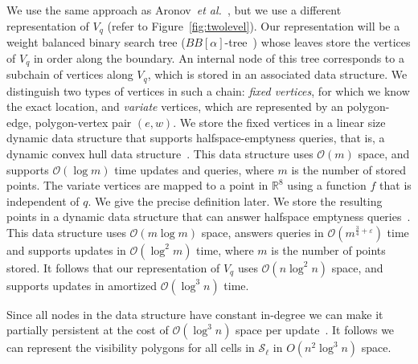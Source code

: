 \documentclass[UKenglish]{lipics-v2019}
\newcommand{\etal}{\textit{et al.}\xspace}
\newcommand{\mkmcal}[1]{\ensuremath{\mathcal{#1}}\xspace}
\renewcommand{\O}{\mkmcal{O}}
\renewcommand{\S}{\mkmcal{S}}
\newcommand{\eps}{\ensuremath{\varepsilon}\xspace}
\newcommand{\mkmbb}[1]{\ensuremath{\mathbb{#1}}\xspace}
\newcommand{\R}{\mkmbb{R}}
\begin{document}
We use the same approach as Aronov~\etal~\cite{aronov2002visibility},
but we use a different representation of $V_q$ (refer to Figure~\ref{fig:twolevel}). Our representation
will be a weight balanced binary search tree
($BB[\alpha]$-tree~\cite{nievergelt1973bbalphatree}) whose leaves
store the vertices of $V_q$ in order along the boundary. An internal
node of this tree corresponds to a subchain of vertices along $V_q$,
which is stored in an associated data structure. We distinguish two
types of vertices in such a chain: \emph{fixed vertices}, for which we
know the exact location, and \emph{variate} vertices, which are
represented by an polygon-edge, polygon-vertex pair $(e,w)$. We store
the fixed vertices in a linear size dynamic data structure that
supports halfspace-emptyness queries, that is, a dynamic convex hull
data structure~\cite{brodal2002dynamic}. This data structure uses $\O(m)$
space, and supports $\O(\log m)$ time updates and queries, where $m$
is the number of stored points. The variate vertices are mapped to a
point in $\R^8$ using a function $f$ that is independent of $q$. We
give the precise definition later. We store the resulting points in a
dynamic data structure that can answer halfspace emptyness
queries~\cite{agarwal1995dynamichalfspace}. This data structure uses
$\O(m\log m)$ space, answers queries in $\O(m^{\frac{3}{4}+\eps})$ time and
supports updates in $\O(\log^2 m)$ time, where $m$ is the number of
points stored. It follows that our representation of $V_q$ uses
$\O(n\log^2 n)$ space, and supports updates in amortized
$\O(\log^3 n)$ time.

Since all nodes in the data structure have constant in-degree we can
make it partially persistent at the cost of $\O(\log^3 n)$ space per
update~\cite{driscoll1989persistent}. It follows we can represent the
visibility polygons for all cells in $\S_\ell$ in $O(n^2\log^3 n)$
space.
\end{document}
